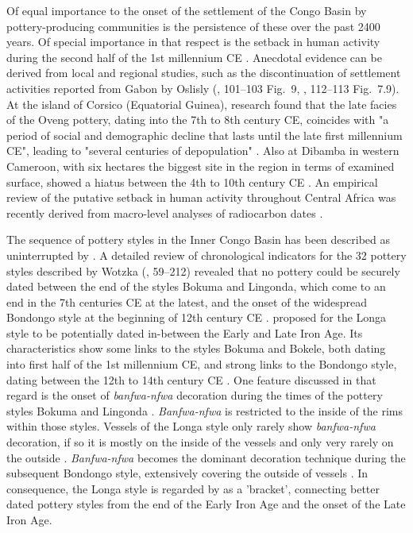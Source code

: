 \documentclass[smallextended,natbib]{svjour3}       %
\begin{document}
Of equal importance to the onset of the settlement of the Congo Basin by pottery-producing communities is the persistence of these over the past 2400 years. Of special importance in that respect is the setback in human activity during the second half of the 1st millennium CE \citep{Seidensticker.2021}. Anecdotal evidence can be derived from local and regional studies, such as the discontinuation of settlement activities reported from Gabon by Oslisly (\citeyear{Oslisly.1998}, 101--103 Fig.~9, \citeyear{Oslisly.2001a}, 112--113 Fig.~7.9). At the island of Corsico (Equatorial Guinea), research found that the late facies of the Oveng pottery, dating into the 7th to 8th century CE, coincides with "a period of social and demographic decline that lasts until the late first millennium CE", leading to "several centuries of depopulation" \citep[355--356]{SanchezElipe.2016}. Also at Dibamba in western Cameroon, with six hectares the biggest site in the region in terms of examined surface, showed a hiatus between the 4th to 10th century CE \citep{Saulieu.2017}. An empirical review of the putative setback in human activity throughout Central Africa was recently derived from macro-level analyses of radiocarbon dates \citep{deSaulieu.2021a,Seidensticker.2021}.

The sequence of pottery styles in the Inner Congo Basin has been described as uninterrupted by \citet{Wotzka.1995}. A detailed review of chronological indicators for the 32 pottery styles described by Wotzka (\citeyear{Wotzka.1995}, 59--212) revealed that no pottery could be securely dated between the end of the styles Bokuma and Lingonda, which come to an end in the 7th centuries CE at the latest, and the onset of the widespread Bondongo style at the beginning of 12th century CE \citep[Fig.~S1; Tab.~S1;][193--204]{Seidensticker.2021e}. \citet[121--128]{Wotzka.1995} proposed for the Longa style to be potentially dated in-between the Early and Late Iron Age. Its characteristics show some links to the styles Bokuma and Bokele, both dating into first half of the 1st millennium CE, and strong links to the Bondongo style, dating between the 12th to 14th century CE \citep[127]{Wotzka.1995}. One feature discussed in that regard is the onset of \textit{banfwa-nfwa} decoration during the times of the pottery styles Bokuma and Lingonda \citep[109--111,117--118]{Wotzka.1995}. \textit{Banfwa-nfwa} is restricted to the inside of the rims within those styles. Vessels of the Longa style only rarely show \textit{banfwa-nfwa} decoration, if so it is mostly on the inside of the vessels and only very rarely on the outside \citep[124]{Wotzka.1995}. \textit{Banfwa-nfwa} becomes the dominant decoration technique during the subsequent Bondongo style, extensively covering the outside of vessels \citep[131--134]{Wotzka.1995}. In consequence, the Longa style is regarded by \citet[125--128]{Wotzka.1995} as a 'bracket', connecting better dated pottery styles from the end of the Early Iron Age and the onset of the Late Iron Age.
\end{document}

